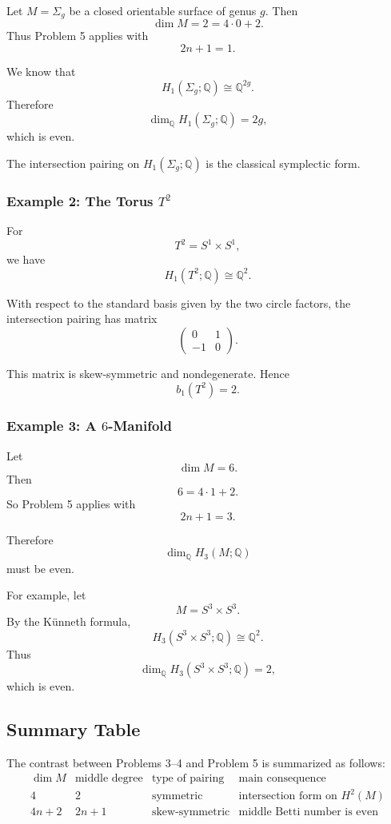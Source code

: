 \documentclass[12pt,a4paper]{article}
\theoremstyle{notespace}
\begin{document}
Let \(M=\Sigma_g\) be a closed orientable surface of genus \(g\). Then
\[
\dim M=2=4\cdot 0+2.
\]
Thus Problem 5 applies with
\[
2n+1=1.
\]

We know that
\[
H_1(\Sigma_g;\mathbb Q)\cong \mathbb Q^{2g}.
\]
Therefore
\[
\dim_{\mathbb Q}H_1(\Sigma_g;\mathbb Q)=2g,
\]
which is even.

The intersection pairing on \(H_1(\Sigma_g;\mathbb Q)\) is the classical
symplectic form.

\subsubsection{Example 2: The Torus \(T^2\)}

For
\[
T^2=S^1\times S^1,
\]
we have
\[
H_1(T^2;\mathbb Q)\cong \mathbb Q^2.
\]

With respect to the standard basis given by the two circle factors, the
intersection pairing has matrix
\[
\begin{pmatrix}
	0&1\\
	-1&0
\end{pmatrix}.
\]

This matrix is skew-symmetric and nondegenerate. Hence
\[
b_1(T^2)=2.
\]

\subsubsection{Example 3: A \(6\)-Manifold}

Let
\[
\dim M=6.
\]
Then
\[
6=4\cdot 1+2.
\]
So Problem 5 applies with
\[
2n+1=3.
\]

Therefore
\[
\dim_{\mathbb Q}H_3(M;\mathbb Q)
\]
must be even.

For example, let
\[
M=S^3\times S^3.
\]
By the Künneth formula,
\[
H_3(S^3\times S^3;\mathbb Q)\cong \mathbb Q^2.
\]
Thus
\[
\dim_{\mathbb Q}H_3(S^3\times S^3;\mathbb Q)=2,
\]
which is even.

\subsection{Summary Table}

The contrast between Problems 3--4 and Problem 5 is summarized as follows:
\[
\begin{array}{c|c|c|c}
	\dim M & \text{middle degree} & \text{type of pairing} & \text{main consequence}\\
	\hline
	4 & 2 & \text{symmetric} & \text{intersection form on }H^2(M)\\
	4n+2 & 2n+1 & \text{skew-symmetric} & \text{middle Betti number is even}
\end{array}
\]
\end{document}
